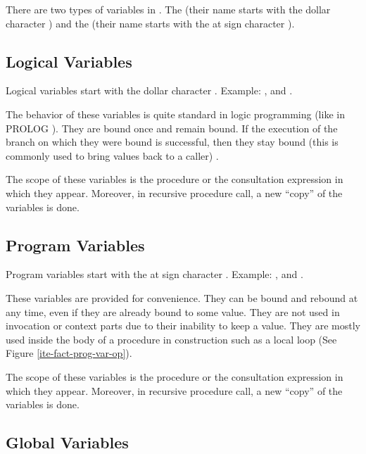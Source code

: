 There are two types of variables in \COPRS. The 
(their name starts with the dollar character \samp{\$}) and the  (their name starts with the at sign character ).



\subsection{Logical Variables}

Logical variables start with the dollar character \samp{\$}.\*
Example: ,  and .

The behavior of these variables is quite standard in logic programming (like
in PROLOG \cite{Clocksin-Mellish84}).  They are bound once and remain bound. If the 
execution of the branch on which they were bound is successful,
then they stay bound (this is commonly used to bring values back to a caller) .

The scope of these variables is the procedure or the consultation expression in
which they appear. Moreover, in recursive procedure call, a new ``copy'' of the
variables is done.

\subsection{Program Variables}

Program variables start with the at sign character .\*
Example: ,  and .


These variables are provided for convenience. They can be bound and rebound
at any time, even if they are already bound to some value. They are not
used in invocation or context parts due to their inability to keep a
value. They are mostly used inside the body of a procedure in construction
such as a local loop (See Figure \ref{ite-fact-prog-var-op}).

The scope of these variables is the procedure or the consultation expression in
which they appear. Moreover, in recursive procedure call, a new ``copy'' of the
variables is done.

\subsection{Global Variables}

